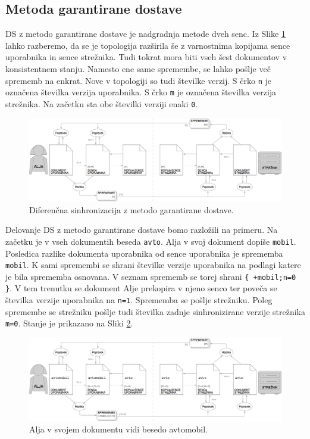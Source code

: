 \documentclass[a4paper, 12pt, twoside]{book}
\begin{document}
\subsection{Metoda garantirane dostave}

DS z metodo garantirane dostave je nadgradnja metode dveh senc. Iz Slike \ref{ds3} lahko razberemo, da se je topologija razširila še z varnostnima kopijama sence uporabnika in sence strežnika. Tudi tokrat mora biti vseh šest dokumentov v konsistentnem stanju. Namesto ene same spremembe, se lahko pošlje več sprememb na enkrat. Nove v topologiji so tudi številke verzij. S črko {\tt n} je označena številka verzija uporabnika. S črko {\tt m} je označena številka verzija strežnika. Na začetku sta obe številki verziji enaki {\tt 0}.

\begin{figure}[placement h]
\begin{center}
\includegraphics[width=16cm]{ds3.png}
\end{center}
\caption{Diferenčna sinhronizacija z metodo garantirane dostave.}
\label{ds3}
\end{figure}

Delovanje DS z metodo garantirane dostave bomo razložili na primeru. Na začetku je v vseh dokumentih beseda {\tt avto}. Alja v svoj dokument dopiše {\tt mobil}. Posledica razlike dokumenta uporabnika od sence uporabnika je sprememba {\tt mobil}. K sami spremembi se shrani številke verzije uporabnika na podlagi katere je bila sprememba osnovana. V seznam sprememb se torej shrani {\tt \{ +mobil;n=0 \}}. V tem trenutku se dokument Alje prekopira v njeno senco ter poveča se številka verzije uporabnika na {\tt n=1}. Sprememba se pošlje strežniku. Poleg spremembe se strežniku pošlje tudi številka zadnje sinhronizirane verzije strežnika {\tt m=0}. Stanje je prikazano na Sliki \ref{ds4}.

\begin{figure}[placement h]
\begin{center}
\includegraphics[width=16cm]{ds4.png}
\end{center}
\caption{Alja v svojem dokumentu vidi besedo avtomobil.}
\label{ds4}
\end{figure}
\end{document}

